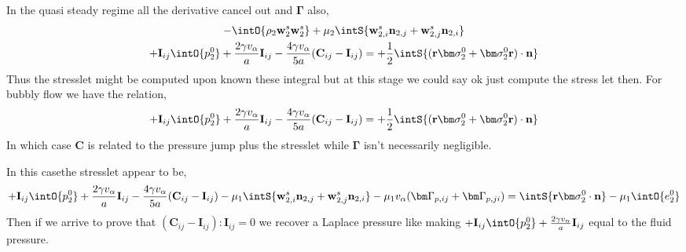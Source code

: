 In the quasi steady regime all the derivative cancel out and $\bm\Gamma$ also,
\begin{multline}    
    - \intO{\rho_2\textbf{w}^s_2\textbf{w}^s_2}
    + \mu_2 \intS{\textbf{w}^s_{2,i}\textbf{n}_{2,j}+ \textbf{w}^s_{2,j}\textbf{n}_{2,i}}\\
    + \textbf{I}_{ij}\intO{p_2^0} 
    + \frac{2 \gamma v_\alpha }{a} \textbf{I}_{ij} 
    - \frac{4 \gamma v_\alpha }{5 a} (\textbf{C}_{ij} - \textbf{I}_{ij})
    =  
    + \frac{1}{2}\intS{(\textbf{r}\bm\sigma_2^0+ \bm\sigma_2^0\textbf{r})\cdot \textbf{n}}
\end{multline}
Thus the stresslet might be computed upon known these integral but at this stage we could say ok just compute the stress let then. 
For bubbly flow we have the relation,
\begin{equation*}
+ \textbf{I}_{ij}\intO{p_2^0} 
+ \frac{2 \gamma v_\alpha }{a} \textbf{I}_{ij} 
- \frac{4 \gamma v_\alpha }{5 a} (\textbf{C}_{ij} - \textbf{I}_{ij})
=  
+ \frac{1}{2}\intS{(\textbf{r}\bm\sigma_2^0+ \bm\sigma_2^0\textbf{r})\cdot \textbf{n}}
\end{equation*}
In which case \textbf{C} is related to the pressure jump plus the stresslet while $\bm\Gamma$ isn't necessarily negligible. 

In this casethe stresslet appear to be, 
\begin{equation*}
    + \textbf{I}_{ij}\intO{p_2^0} 
    + \frac{2 \gamma v_\alpha }{a} \textbf{I}_{ij} 
    - \frac{4 \gamma v_\alpha }{5 a} (\textbf{C}_{ij} - \textbf{I}_{ij})
    - \mu_1 \intS{\textbf{w}^s_{2,i}\textbf{n}_{2,j}+ \textbf{w}^s_{2,j}\textbf{n}_{2,i}}
    - \mu_1 v_\alpha (\bm \Gamma_{p,ij}+\bm \Gamma_{p,ji})
    =  
    \intS{\textbf{r}\bm\sigma_2^0\cdot \textbf{n}}
    - \mu_1 \intO{e_2^0}
\end{equation*}
Then if we arrive to prove that $(\textbf{C}_{ij} - \textbf{I}_{ij}):\textbf{I}_{ij} = 0$ we recover a Laplace pressure like making $+ \textbf{I}_{ij}\intO{p_2^0} 
+ \frac{2 \gamma v_\alpha }{a} \textbf{I}_{ij} $ equal to the fluid pressure. 

